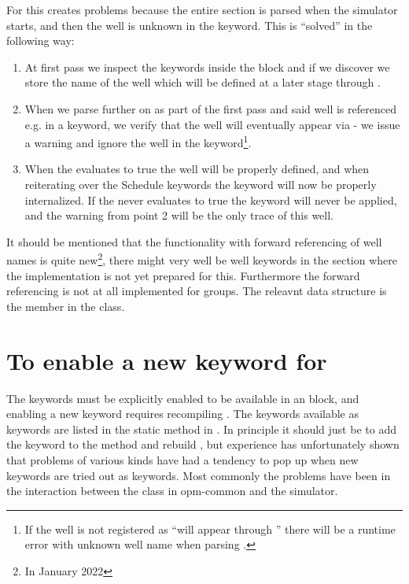 For \flow{} this creates problems because the entire  section is
parsed when the simulator starts, and then the well  is unknown in the
 keyword. This is ``solved'' in the following way:
\begin{enumerate}
\item At first pass we inspect the keywords inside the \actionx{} block and if
  we discover  we store the name of the well which will be defined
  at a later stage through \actionx{}.
\item When we parse further on as part of the first pass and said well is
  referenced e.g. in a  keyword, we verify that the well will
  eventually appear via \actionx{} - we issue a warning and ignore the well in
  the  keyword\footnote{If the well is not registered as ``will
  appear through \actionx{}'' there will be a runtime error with unknown well
  name when parsing .}.
\item When the \actionx{} evaluates to true the well will be properly defined,
  and when reiterating over the Schedule keywords the  keyword will
  now be properly internalized. If the \actionx{} never evaluates to true the
   keyword will never be applied, and the warning from point 2 will
  be the only trace of this well.
\end{enumerate}
It should be mentioned that the functionality with forward referencing of well
names is quite new\footnote{In January 2022}, there might very well be well
keywords in the  section where the implementation is not yet
prepared for this. Furthermore the forward referencing is not at all implemented
for groups. The releavnt data structure is the member
 in the  class.


\section{To enable a new keyword for \actionx}
The keywords must be explicitly enabled to be available in an \actionx{} block,
and enabling a new keyword requires recompiling \flow{}. The keywords available
as \actionx{} keywords are listed in the static method
 in
. In principle it should
just be to add the keyword to the  method
and rebuild \flow{}, but experience has unfortunately shown that problems of
various kinds have had a tendency to pop up when new keywords are tried out as
\actionx{} keywords. Most commonly the problems have been in the interaction
between the  class in opm-common and the simulator.


